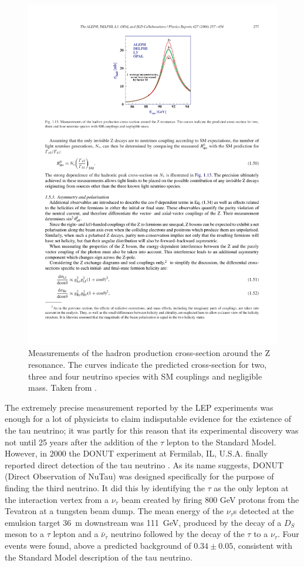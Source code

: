 \begin{figure}
  \centering
  \includegraphics[width=12cm]{LEPZ0Resonance.pdf}
  \caption[Measurements of the hadron production cross-section around the Z resonance.]{Measurements of the hadron production cross-section around the Z resonance.  The curves indicate the predicted cross-section for two, three and four neutrino species with SM couplings and negligible mass.  Taken from \cite{Schael2006}.}
  \label{fig:LEPZ0Resonance}
\end{figure}

The extremely precise measurement reported by the LEP experiments was enough for a lot of physicists to claim indisputable evidence for the existence of the tau neutrino; it was partly for this reason that its experimental discovery was not until 25 years after the addition of the $\tau$ lepton to the Standard Model.  However, in 2000 the DONUT experiment at Fermilab, IL, U.S.A. finally reported direct detection of the tau neutrino \cite{Kodama2001}.  As its name suggests, DONUT (Direct Observation of NuTau) was designed specifically for the purpose of finding the third neutrino.  It did this by identifying the $\tau$ as the only lepton at the interaction vertex from a $\nu_{\tau}$ beam created by firing 800 GeV protons from the Tevatron at a tungsten beam dump.  The mean energy of the $\nu_{\tau}$s detected at the emulsion target 36~m downstream was 111~GeV, produced by the decay of a $D_S$ meson to a $\tau$ lepton and a $\bar{\nu}_{\tau}$ neutrino followed by the decay of the $\tau$ to a $\nu_{\tau}$.  Four events were found, above a predicted background of $0.34\pm0.05$, consistent with the Standard Model description of the tau neutrino.

